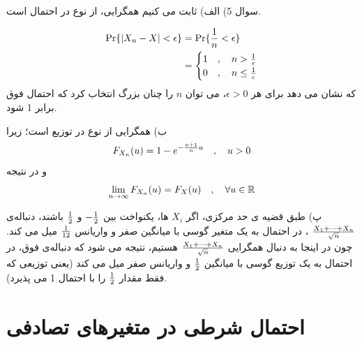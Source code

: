 \documentclass[10pt,letterpaper]{report}
\newcommand{\eqn}[1]{
\[\begin{split}
#1
\end{split}\]
}
\begin{document}
سوال 5) الف) ثابت می کنیم همگرایی، از نوع در احتمال است.
\eqn{
\Pr\{|X_n-X|<\epsilon\}&=\Pr\{{1\over n}<\epsilon\}
\\&=\begin{cases}
1&,\quad n>{1\over \epsilon}\\
0&,\quad n\le {1\over \epsilon}
\end{cases}
}{}
که نشان می دهد برای هر $\epsilon>0$، می توان $n$ را چنان بزرگ انتخاب کرد که احتمال فوق برابر 1 شود.

ب) همگرایی از نوع در توزیع است؛ زیرا
$$
F_{X_n}(u)=1-e^{-{n+1\over n}u}\quad,\quad u>0
$$
و در نتیجه
$$
\lim_{n\to \infty}F_{X_n}(u)=F_X(u)\quad,\quad \forall u\in \Bbb R
$$

پ) طبق قضیه ی حد مرکزی، اگر $X_i$ ها، یکنواخت بین $-{1\over 2}$ و $1\over 2$ باشند، دنباله‌ی 
$
X_1+\cdots+X_n\over \sqrt n
$
، در احتمال به یک متغیر گوسی با میانگین صفر و واریانس $1\over 12$ میل می کند. چون در اینجا به دنبال همگرایی 
$
X_1+\cdots+X_n\over \sqrt n
$
هستیم، نتیجه می شود که دنباله‌ی فوق، در احتمال به یک توزیع گوسی با میانگین $1\over 2$ و واریانس صفر میل می کند (یعنی توزیعی که فقط مقدار $1\over 2$ را با احتمال 1 می پذیرد).

\chapter{احتمال شرطی در متغیرهای تصادفی}
\end{document}
